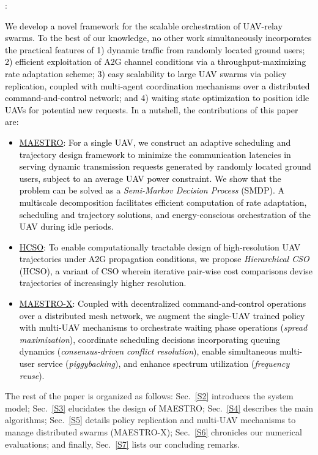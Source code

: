 \documentclass[12pt, draftcls, onecolumn]{IEEEtran}
\theoremstyle{plain}
\theoremstyle{definition}
\theoremstyle{remark}
\newcommand\hlt[1]{\textcolor{black}{#1}}
\begin{document}
\label{contrib_subs}
\noindent{\hlt{\textbf{Contributions}}}: \hlt{We develop a novel framework for the scalable orchestration of UAV-relay swarms. To the best of our knowledge, no other work simultaneously incorporates the practical features of 1) dynamic traffic from randomly located ground users; 2) efficient exploitation of A2G channel conditions via a throughput-maximizing rate adaptation scheme; 3) easy scalability to large UAV swarms via policy replication, coupled with multi-agent coordination mechanisms over a distributed command-and-control network; and 4) waiting state optimization to position idle UAVs for potential new requests. In a nutshell, the contributions of this paper are:
\begin{itemize}[leftmargin=*]
    \item \underline{MAESTRO}: For a single UAV, we construct an adaptive scheduling and trajectory design framework to minimize the communication latencies in serving dynamic transmission requests generated by randomly located ground users, subject to an average UAV power constraint. We show that the problem can be solved as a \emph{Semi-Markov Decision Process} (SMDP). A multiscale decomposition facilitates efficient computation of rate adaptation, scheduling and trajectory solutions, and energy-conscious orchestration of the UAV during idle periods.
    \item \underline{HCSO}: To enable computationally tractable design of high-resolution UAV trajectories under A2G propagation conditions, we propose \emph{Hierarchical CSO} (HCSO), a variant of CSO wherein iterative pair-wise cost comparisons devise trajectories of increasingly higher resolution.
    \item \underline{MAESTRO-X}: Coupled with decentralized command-and-control operations over a distributed mesh network, we augment the single-UAV trained policy with multi-UAV mechanisms to orchestrate waiting phase operations (\emph{spread maximization}), coordinate scheduling decisions incorporating queuing dynamics (\emph{consensus-driven conflict resolution}), enable simultaneous multi-user service (\emph{piggybacking}), and enhance spectrum utilization (\emph{frequency reuse}).
\end{itemize}}

The rest of the paper is organized as follows: Sec.~\ref{S2} introduces the system model; Sec.~\ref{S3} elucidates the design of MAESTRO; Sec.~\ref{S4} describes the main algorithms; Sec.~\ref{S5} details policy replication and multi-UAV mechanisms to manage distributed swarms (MAESTRO-X); Sec.~\ref{S6} chronicles our numerical evaluations; and finally, Sec.~\ref{S7} lists our concluding remarks.
\vspace{-4mm}
\end{document}
